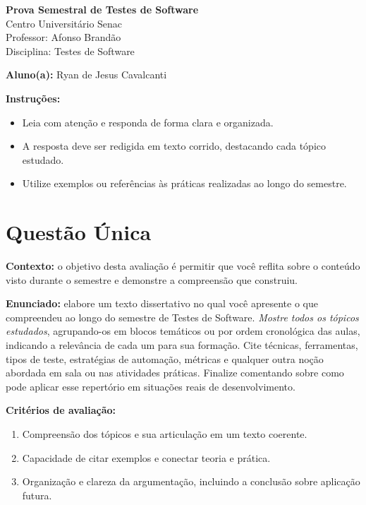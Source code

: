 \documentclass[12pt]{article}
\begin{document}
\newpage


\begin{center}
  {\Large \textbf{Prova Semestral de Testes de Software}}\\
  Centro Universitário Senac\\
  Professor: Afonso Brandão\\
  Disciplina: Testes de Software
\end{center}

\vspace{0.4cm}

\begin{center}
  \textbf{Aluno(a):} Ryan de Jesus Cavalcanti
\end{center}

\vspace{0.5cm}

\begin{center}
  \textbf{Instruções:}
\end{center}
\begin{itemize}[leftmargin=*]
  \item Leia com atenção e responda de forma clara e organizada.
  \item A resposta deve ser redigida em texto corrido, destacando cada tópico estudado.
  \item Utilize exemplos ou referências às práticas realizadas ao longo do semestre.
\end{itemize}

\section*{Questão Única}
\textbf{Contexto:} o objetivo desta avaliação é permitir que você reflita sobre o conteúdo visto durante o semestre e demonstre a compreensão que construiu.

\textbf{Enunciado:} elabore um texto dissertativo no qual você apresente o que compreendeu ao longo do semestre de Testes de Software. \textit{Mostre todos os tópicos estudados}, agrupando-os em blocos temáticos ou por ordem cronológica das aulas, indicando a relevância de cada um para sua formação. Cite técnicas, ferramentas, tipos de teste, estratégias de automação, métricas e qualquer outra noção abordada em sala ou nas atividades práticas. Finalize comentando sobre como pode aplicar esse repertório em situações reais de desenvolvimento.

\textbf{Critérios de avaliação:}
\begin{enumerate}[label=\arabic*.]
  \item Compreensão dos tópicos e sua articulação em um texto coerente.
  \item Capacidade de citar exemplos e conectar teoria e prática.
  \item Organização e clareza da argumentação, incluindo a conclusão sobre aplicação futura.
\end{enumerate}
\end{document}
